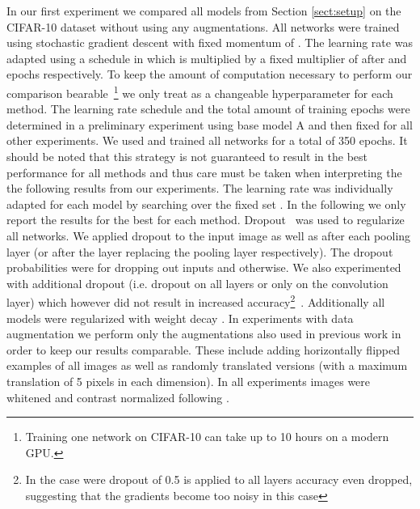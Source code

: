 \documentclass{article} \usepackage{iclr2015,times}
\begin{document}
In our first experiment we compared all models from Section
\ref{sect:setup} on the CIFAR-10 dataset without using any
augmentations. All networks were trained using stochastic gradient
descent with fixed momentum of . The learning rate  was adapted
using a schedule  in which  is multiplied by a fixed multiplier
of  after  and  epochs respectively. 
To keep the amount of computation necessary to perform
our comparison bearable~\footnote{Training one network on CIFAR-10 can
  take up to 10 hours on a modern GPU.} we only treat  as a
changeable hyperparameter for each method. The learning rate schedule
and the total amount of training epochs were determined in a preliminary
experiment using base model A and then fixed for all other
experiments. We used  and trained all networks
for a total of 350 epochs. It should be noted that this strategy is not guaranteed to result in the best
performance for all methods and thus care must be taken when
interpreting the the following results from our experiments.
The learning rate  was individually adapted for each model by
searching over the fixed set . In the following we only report the results for the best
 for each method. 
Dropout~\citep{Hinton_arxiv2012} was used to regularize all networks. We
applied dropout to the input image as well as after each pooling layer
(or after the layer replacing the pooling layer respectively). The
dropout probabilities were  for dropping out inputs and 
otherwise. We also experimented with additional dropout (i.e. dropout
on all layers or only on the  convolution layer) which
however did not result in increased accuracy\footnote{In the case were
dropout of 0.5 is applied to all layers accuracy even dropped,
suggesting that the gradients become too noisy in this case}~. 
Additionally all models were regularized with weight decay . In experiments with data augmentation we perform only the
augmentations also used in previous work
\citep{Goodfellow2013,Lin_2014} in order to keep our results
comparable. These include adding horizontally flipped examples of
all images as well as randomly translated versions (with a maximum
translation of 5 pixels in each dimension). In all experiments images
were whitened and contrast normalized following \citet{Goodfellow2013}.
\end{document}
